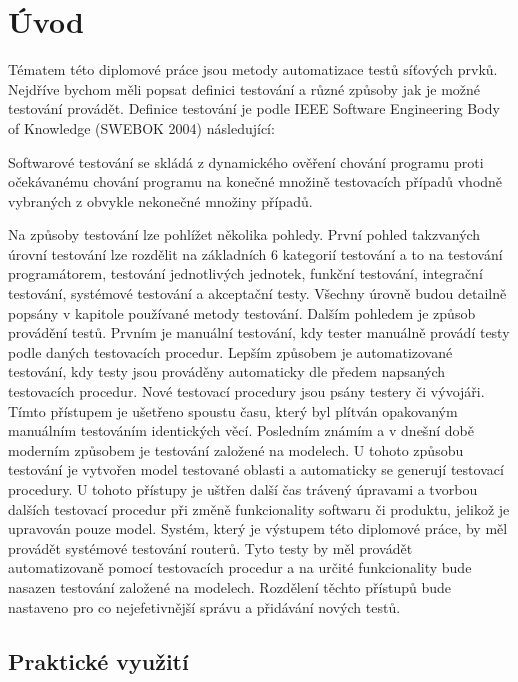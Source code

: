 \chapter{Úvod}
Tématem této diplomové práce jsou metody automatizace testů síťových prvků. Nejdříve bychom měli popsat definici testování a různé způsoby jak je možné testování provádět. Definice testování je podle IEEE Software Engineering Body of Knowledge (SWEBOK 2004) následující:

Softwarové testování se skládá z dynamického ověření chování programu proti očekávanému chování programu na konečné množině testovacích případů vhodně vybraných z obvykle nekonečné množiny případů.

Na způsoby testování lze pohlížet několika pohledy. První pohled takzvaných úrovní testování lze rozdělit na základních 6 kategorií testování a to na testování programátorem, testování jednotlivých jednotek, funkční testování, integrační testování, systémové testování a akceptační testy. Všechny úrovně budou detailně popsány v kapitole používané metody testování. Dalším pohledem je způsob provádění testů. Prvním je manuální testování, kdy tester manuálně provádí testy podle daných testovacích procedur. Lepším způsobem je automatizované testování, kdy testy jsou prováděny automaticky dle předem napsaných testovacích procedur. Nové testovací procedury jsou psány testery či vývojáři. Tímto přístupem je ušetřeno spoustu času, který byl plítván opakovaným manuálním testováním identických věcí. Posledním známím a v dnešní době moderním způsobem je testování založené na modelech. U tohoto způsobu testování je vytvořen model testované oblasti a automaticky se generují testovací procedury. U tohoto přístupy je uštřen další čas trávený úpravami a tvorbou dalších testovací procedur při změně funkcionality softwaru či produktu, jelikož je upravován pouze model. Systém, který je výstupem této diplomové práce, by měl provádět systémové testování routerů. Tyto testy by měl provádět automatizovaně pomocí testovacích procedur a na určité funkcionality bude nasazen testování založené na modelech. Rozdělení těchto přístupů bude nastaveno pro co nejefetivnější správu a přidávání nových testů.

\section{Praktické využití}

